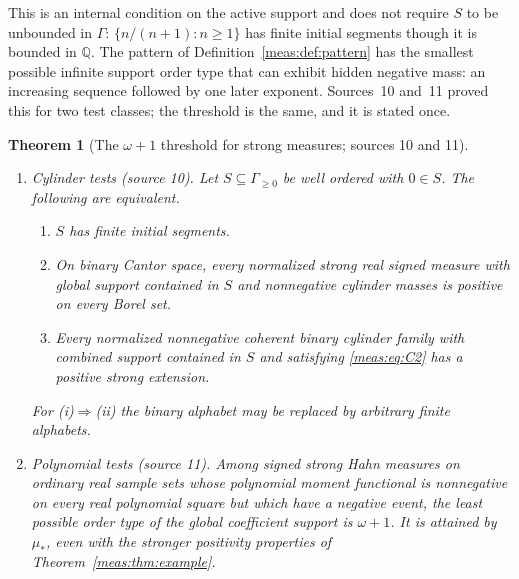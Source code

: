 \documentclass[11pt]{article}
\numberwithin{equation}{section}
\newtheorem{theorem}{Theorem}[section]
\theoremstyle{definition}
\theoremstyle{remark}
\newcommand{\Q}{\mathbb Q}
\begin{document}
This is an internal condition on the active support and does not require $S$ to
be unbounded in $\Gamma$: $\{n/(n+1):n\ge1\}$ has finite initial segments though
it is bounded in $\Q$. The pattern of Definition~\ref{meas:def:pattern} has the
smallest possible infinite support order type that can exhibit hidden negative
mass: an increasing sequence followed by one later exponent. Sources~10 and~11
proved this for two test classes; the threshold is the same, and it is stated
once.

\begin{theorem}[The $\omega+1$ threshold for strong measures; sources 10
and 11]\label{meas:thm:threshold}
\hfill
\begin{enumerate}[label=(\alph*)]
\item \emph{Cylinder tests} (source 10). Let $S\subseteq\Gamma_{\ge0}$ be well
ordered with $0\in S$. The following are equivalent.
\begin{enumerate}[label=(\roman*)]
\item $S$ has finite initial segments.
\item On binary Cantor space, every normalized strong real signed measure with
global support contained in $S$ and nonnegative cylinder masses is positive on
every Borel set.
\item Every normalized nonnegative coherent binary cylinder family with
combined support contained in $S$ and satisfying \eqref{meas:eq:C2} has a positive
strong extension.
\end{enumerate}
For (i)$\Rightarrow$(ii) the binary alphabet may be replaced by arbitrary finite
alphabets.
\item \emph{Polynomial tests} (source 11). Among signed strong Hahn measures on
ordinary real sample sets whose polynomial moment functional is nonnegative on
every real polynomial square but which have a negative event, the least
possible order type of the global coefficient support is $\omega+1$. It is
attained by $\mu_*$, even with the stronger positivity properties of
Theorem~\ref{meas:thm:example}.
\end{enumerate}
\end{theorem}
\end{document}
